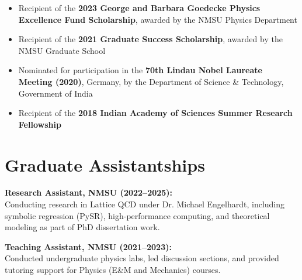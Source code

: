 \documentclass[11pt]{article}
\begin{document}
\begin{itemize}
    \item Recipient of the \textbf{2023 George and Barbara Goedecke Physics Excellence Fund Scholarship}, awarded by the NMSU Physics Department

    \item Recipient of the \textbf{2021 Graduate Success Scholarship}, awarded by the NMSU Graduate School

    \item Nominated for participation in the \textbf{70th Lindau Nobel Laureate Meeting (2020)}, Germany, by the Department of Science \& Technology, Government of India

    \item Recipient of the \textbf{2018 Indian Academy of Sciences Summer Research Fellowship}
\end{itemize}

\section*{Graduate Assistantships}

\vspace{-0.3em}
\textbf{Research Assistant, NMSU (2022–2025):} \\
Conducting research in Lattice QCD under Dr. Michael Engelhardt, including symbolic regression (PySR), high-performance computing, and theoretical modeling as part of PhD dissertation work.

\vspace{-0.3em}
\textbf{Teaching Assistant, NMSU (2021–2023):} \\
Conducted undergraduate physics labs, led discussion sections, and provided tutoring support for Physics (E\&M and Mechanics) courses.
\end{document}

